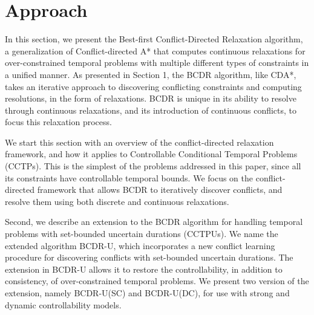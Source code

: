 \documentclass[jair,twoside,11pt,theapa]{article}
\begin{document}


\section{Approach}


In this section, we present the Best-first Conflict-Directed Relaxation
algorithm, a generalization of Conflict-directed A* \cite{Williams_CDAstar_2002}
that computes continuous relaxations for over-constrained temporal problems with
multiple different types of constraints in a unified manner. As presented in
Section 1, the BCDR algorithm, like CDA*, takes an iterative approach to discovering
conflicting constraints and computing resolutions, in the form of relaxations.
BCDR is unique in its ability to resolve through continuous relaxations, and its
introduction of continuous conflicts, to focus this relaxation process.


We start this section with an overview of the conflict-directed relaxation
framework, and how it applies to Controllable Conditional Temporal Problems
(CCTPs). This is the simplest of the problems addressed in this paper, since all
its constraints have controllable temporal bounds. We focus on the conflict-directed framework that allows BCDR to iteratively discover conflicts, and resolve them using both discrete and continuous relaxations. 


Second, we describe an extension to the BCDR algorithm for handling temporal
problems with set-bounded uncertain durations (CCTPUs). We name the extended
algorithm BCDR-U, which incorporates a new conflict learning procedure for
discovering conflicts with set-bounded uncertain durations. The extension in BCDR-U
allows it to restore the controllability, in addition to consistency, of
over-constrained temporal problems. We present two version of the extension, namely BCDR-U(SC) and BCDR-U(DC), for use with strong and dynamic controllability models. 


%
%
%
%
%
%
\end{document}
